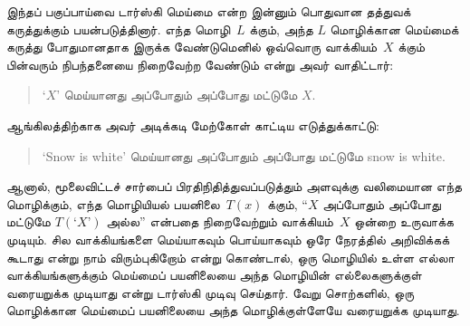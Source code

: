 \documentclass[../../../include/open-logic-section]{subfiles}
\begin{document}
இந்தப் பகுப்பாய்வை டார்ஸ்கி மெய்மை என்ற இன்னும் பொதுவான
தத்துவக் கருத்துக்கும் பயன்படுத்தினார். எந்த மொழி~$L$ க்கும், அந்த
$L$ மொழிக்கான மெய்மைக் கருத்து போதுமானதாக இருக்க வேண்டுமெனில் ஒவ்வொரு
வாக்கியம்~$X$ க்கும் பின்வரும் நிபந்தனையை நிறைவேற்ற வேண்டும் என்று
அவர் வாதிட்டார்:
\begin{quote}
‘$X$’ மெய்யானது அப்போதும் அப்போது மட்டுமே $X$.
\end{quote}
ஆங்கிலத்திற்காக அவர் அடிக்கடி மேற்கோள் காட்டிய எடுத்துக்காட்டு:
\begin{quote}
‘Snow is white’ மெய்யானது அப்போதும் அப்போது மட்டுமே snow is white.
\end{quote}
ஆனால், மூலைவிட்டச் சார்பைப் பிரதிநிதித்துவப்படுத்தும் அளவுக்கு
வலிமையான எந்த மொழிக்கும், எந்த மொழியியல் பயனிலை~$T(x)$ க்கும்,
“$X$ அப்போதும் அப்போது மட்டுமே $T(\text{‘$X$’})$ அல்ல” என்பதை
நிறைவேற்றும் வாக்கியம்~$X$ ஒன்றை உருவாக்க முடியும். சில
வாக்கியங்களை மெய்யாகவும் பொய்யாகவும் ஒரே நேரத்தில் அறிவிக்கக் கூடாது
என்று நாம் விரும்புகிறோம் என்று கொண்டால், ஒரு மொழியில் உள்ள எல்லா
வாக்கியங்களுக்கும் மெய்மைப் பயனிலையை அந்த மொழியின் எல்லைகளுக்குள்
வரையறுக்க முடியாது என்று டார்ஸ்கி முடிவு செய்தார். வேறு சொற்களில்,
ஒரு மொழிக்கான மெய்மைப் பயனிலையை அந்த மொழிக்குள்ளேயே
வரையறுக்க முடியாது.
\end{document}
